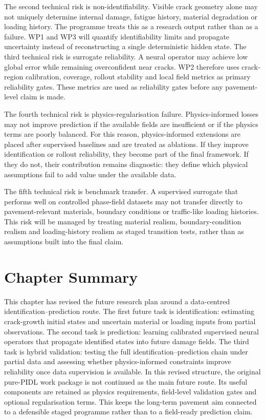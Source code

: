 The second technical risk is non-identifiability.
Visible crack geometry alone may not uniquely determine internal damage, fatigue history, material degradation or loading history.
The programme treats this as a research output rather than as a failure.
WP1 and WP3 will quantify identifiability limits and propagate uncertainty instead of reconstructing a single deterministic hidden state.
The third technical risk is surrogate reliability. A neural operator may achieve low global error while remaining overconfident near cracks.
WP2 therefore uses crack-region calibration, coverage, rollout stability and local field metrics as primary reliability gates.
These metrics are used as reliability gates before any pavement-level claim is made.

The fourth technical risk is physics-regularisation failure.
Physics-informed losses may not improve prediction if the available fields are insufficient or if the physics terms are poorly balanced.
For this reason, physics-informed extensions are placed after supervised baselines and are treated as ablations.
If they improve identification or rollout reliability, they become part of the final framework.
If they do not, their contribution remains diagnostic: they define which physical assumptions fail to add value under the available data. 

The fifth technical risk is benchmark transfer. A supervised surrogate that performs well on controlled phase-field datasets may not transfer directly to pavement-relevant materials, boundary conditions or traffic-like loading histories. This risk will be managed by treating material realism, boundary-condition realism and loading-history realism as staged transition tests, rather than as assumptions built into the final claim.

\section{Chapter Summary}

This chapter has revised the future research plan around a data-centred identification--prediction route.
The first future task is identification: estimating crack-growth initial states and uncertain material or loading inputs from partial observations.
The second task is prediction: learning calibrated supervised neural operators that propagate identified states into future damage fields.
The third task is hybrid validation: testing the full identification--prediction chain under partial data and assessing whether physics-informed constraints improve reliability once data supervision is available.
In this revised structure, the original pure-PIDL work package is not continued as the main future route.
Its useful components are retained as physics requirements, field-level validation gates and optional regularisation terms.
This keeps the long-term pavement aim connected to a defensible staged programme rather than to a field-ready prediction claim.

